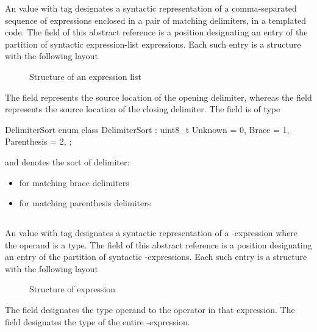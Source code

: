 An  value with tag  designates a syntactic representation
of a comma-separated sequence of expressions enclosed in a pair of matching delimiters, in a templated code.
The  field of this abstract reference is a position designating an entry of the partition of
syntactic expression-list expressions.  Each such entry is a structure with the following layout
%
\begin{figure}[H]
	\centering
	\caption{Structure of an expression list}
	\label{fig:ifc:ExprSort:ExpressionList}
\end{figure}
%
The  field represents the source location of the opening delimiter, whereas the 
field represents the source location of the closing delimiter.
The  field is of type
\begin{typedef}{DelimiterSort}{}
	enum class DelimiterSort : uint8_t {
		Unknown = 0,
		Brace = 1,
		Parenthesis = 2,
	};
\end{typedef}
and denotes the sort of delimiter:
\begin{itemize}
	\item {} for matching brace delimiters
	\item {} for matching parenthesis delimiters
\end{itemize}




\subsection{}
\label{sec:ifc:ExprSort:SizeofType}

An  value with tag  designates a syntactic representation
of a -expression where the operand is a type.
The  field of this abstract reference is a position designating an entry of the partition
of syntactic -expressions.  Each such entry is a structure with the following layout
%
\begin{figure}[H]
	\centering
	\caption{Structure of  expression}
	\label{fig:ifc:ExprSort:SizeofType}
\end{figure}
%
The  field designates the type operand to the  operator in that expression.
The  field designates the type of the entire -expression.

